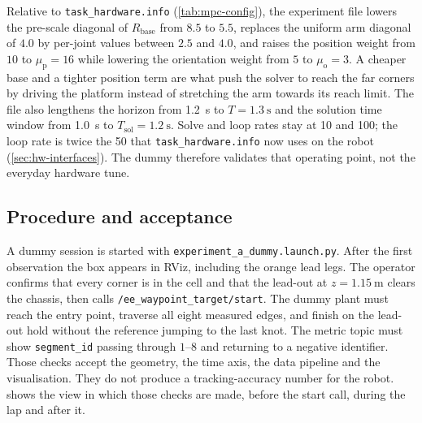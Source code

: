 Relative to \texttt{task\_hardware.info} (\cref{tab:mpc-config}), the
experiment file lowers the pre-scale diagonal of $R_{\mathrm{base}}$
from $8.5$ to $5.5$, replaces the uniform arm diagonal of $4.0$ by
per-joint values between $2.5$ and $4.0$, and raises the \ee{} position
weight from $10$ to $\mu_{\mathrm{p}}=16$ while lowering the orientation
weight from $5$ to $\mu_{\mathrm{o}}=3$. A cheaper base and a tighter
position term are what push the solver to reach the far corners by
driving the platform instead of stretching the arm towards its reach
limit. The file also lengthens the horizon from \qty{1.2}{\second} to
$T=\qty{1.3}{\second}$ and the solution time window from
\qty{1.0}{\second} to $T_{\mathrm{sol}}=\qty{1.2}{\second}$. Solve and
loop rates stay at \qty{10}{\hz} and \qty{100}{\hz}; the loop rate is
twice the \qty{50}{\hz} that \texttt{task\_hardware.info} now uses on the
robot (\cref{sec:hw-interfaces}). The dummy
therefore validates that operating point, not the everyday hardware
tune.

\subsection{Procedure and acceptance}
\label{sec:sim-acceptance}

A dummy session is started with
\texttt{experiment\_a\_dummy.launch.py}. After the first observation the
box appears in RViz, including the orange lead legs. The operator
confirms that every corner is in the cell and that the lead-out at
$z=\qty{1.15}{\meter}$ clears the chassis, then calls
\texttt{/ee\_waypoint\_target/start}. The dummy plant must reach the
entry point, traverse all eight measured edges, and finish on the
lead-out hold without the reference jumping to the last knot. The
metric topic must show \texttt{segment\_id} passing through $1$--$8$
and returning to a negative identifier. Those checks accept the
geometry, the \ocs{} time axis, the data pipeline and the visualisation.
They do not produce a tracking-accuracy number for the robot.
 shows the view in which those checks are made,
before the start call, during the lap and after it.

